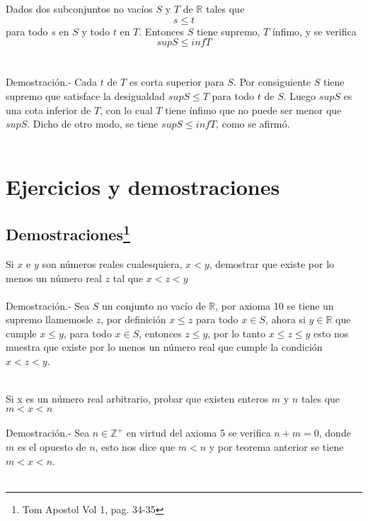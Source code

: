 \begin{teo}
Dados dos subconjuntos no vacíos $S$ y $T$ de $\mathbb{R}$ tales que $$s\leq t$$ para todo $s$ en $S$ y todo $t$ en $T$. Entonces $S$ tiene supremo, $T$ ínfimo, y se verifica $$supS\leq infT$$\\\\
Demostración.- \; Cada $t$ de $T$ es corta superior para $S$. Por consiguiente $S$ tiene supremo que satisface la desigualdad $supS\leq T$ para todo $t$ de $S$. Luego $supS$ es una cota inferior de $T$, con lo cual $T$ tiene ínfimo que no puede ser menor que $supS$. Dicho de otro modo, se tiene $supS\leq infT$, como se afirmó.\\\\
\end{teo}

\section*{Ejercicios y demostraciones}
\subsection[Demostraciones]{Demostraciones\footnote{Tom Apostol Vol 1, pag. 34-35}}
\begin{teo}
Si $x$ e $y$ son números reales cualesquiera, $x<y$, demostrar que existe por lo menos un número real $z$ tal que $x<z<y$\\\\
Demostración.- \; Sea $S$ un conjunto no vacío de $\mathbb{R}$, por axioma 10 se tiene un supremo llamemosle $z$, por definición $x\leq z$ para todo $x\in S$, ahora si $y\in \mathbb{R}$ \; que cumple $x\leq y$, para todo $x\in S$, entonces $z\leq y$, por lo tanto $x\leq z \leq y$ esto  nos muestra que existe por lo menos un número real que cumple la condición $x<z<y$. \\\\
\end{teo}

\begin{teo}
Si x es un número real arbitrario, probar que existen enteros $m$ y $n$ tales que $m<x<n$\\\\
Demostración.- \;  Sea $n\in \mathbb{Z}^+$ en virtud del axioma 5 se verifica $n+m=0$, donde $m$ es el opuesto de $n$, esto nos dice que $m<n$ y por teorema anterior se tiene $m<x<n$.\\\\
\end{teo}

